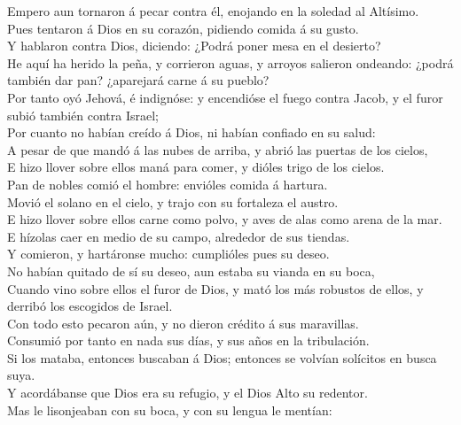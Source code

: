  Empero aun tornaron á pecar contra él, enojando en la
soledad al Altísimo.\\
 Pues tentaron á Dios en su corazón, pidiendo comida á su
gusto.\\
 Y hablaron contra Dios, diciendo: ¿Podrá poner mesa en el
desierto?\\
 He aquí ha herido la peña, y corrieron aguas, y arroyos
salieron ondeando: ¿podrá también dar pan? ¿aparejará carne á su
pueblo?\\
 Por tanto oyó Jehová, é indignóse: y encendióse el fuego
contra Jacob, y el furor subió también contra Israel;\\
 Por cuanto no habían creído á Dios, ni habían confiado en
su salud:\\
 A pesar de que mandó á las nubes de arriba, y abrió las
puertas de los cielos,\\
 E hizo llover sobre ellos maná para comer, y dióles trigo
de los cielos.\\
 Pan de nobles comió el hombre: envióles comida á
hartura.\\
 Movió el solano en el cielo, y trajo con su fortaleza el
austro.\\
 E hizo llover sobre ellos carne como polvo, y aves de alas
como arena de la mar.\\
 E hízolas caer en medio de su campo, alrededor de sus
tiendas.\\
 Y comieron, y hartáronse mucho: cumplióles pues su
deseo.\\
 No habían quitado de sí su deseo, aun estaba su vianda en
su boca,\\
 Cuando vino sobre ellos el furor de Dios, y mató los más
robustos de ellos, y derribó los escogidos de Israel.\\
 Con todo esto pecaron aún, y no dieron crédito á sus
maravillas.\\
 Consumió por tanto en nada sus días, y sus años en la
tribulación.\\
 Si los mataba, entonces buscaban á Dios; entonces se
volvían solícitos en busca suya.\\
 Y acordábanse que Dios era su refugio, y el Dios Alto su
redentor.\\
 Mas le lisonjeaban con su boca, y con su lengua le
mentían:\\
